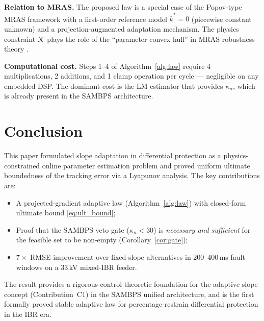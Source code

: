 \documentclass[journal]{IEEEtran}
\newcommand{\kappan}{\kappa_{n}}
\newcommand{\calK}{\mathcal{K}}
\begin{document}
\textbf{Relation to MRAS.}
The proposed law is a special case of the Popov-type MRAS framework
\cite{Narendra1989} with a first-order reference model $\dot{k}^* = 0$
(piecewise constant unknown) and a projection-augmented adaptation
mechanism.  The physics constraint $\calK$ plays the role of the
``parameter convex hull'' in MRAS robustness theory \cite{Ioannou1996}.

\textbf{Computational cost.}
Steps 1--4 of Algorithm~\ref{alg:law} require 4 multiplications,
2 additions, and 1 clamp operation per cycle --- negligible on any
embedded DSP.  The dominant cost is the LM estimator that provides
$\kappan$, which is already present in the SAMBPS architecture.

\section{Conclusion}
\label{sec:conc}

This paper formulated slope adaptation in differential protection as a
physics-constrained online parameter estimation problem and proved
uniform ultimate boundedness of the tracking error via a Lyapunov
analysis.  The key contributions are:
\begin{itemize}
  \item A projected-gradient adaptive law (Algorithm~\ref{alg:law})
        with closed-form ultimate bound \eqref{eq:ult_bound};
  \item Proof that the SAMBPS veto gate ($\kappan < 30$) is
        \emph{necessary and sufficient} for the feasible set to be
        non-empty (Corollary~\ref{cor:gate});
  \item $7\times$ RMSE improvement over fixed-slope alternatives
        in 200--400\,ms fault windows on a 33\,kV mixed-IBR feeder.
\end{itemize}
The result provides a rigorous control-theoretic foundation for the
adaptive slope concept (Contribution~C1) in the SAMBPS unified
architecture, and is the first formally proved stable adaptive law
for percentage-restrain differential protection in the IBR era.



\end{document}
